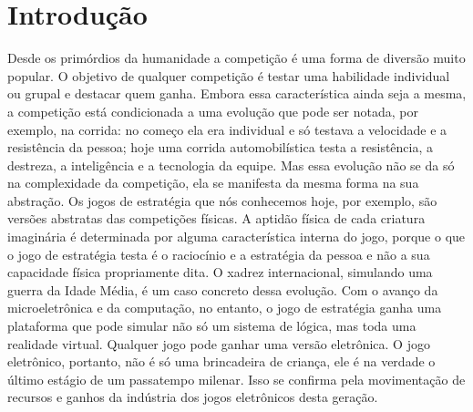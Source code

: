 \chapter{Introdução}
\label{cap:indtroducao}
%
Desde os primórdios da humanidade a competição é uma forma de diversão muito popular. O objetivo de qualquer competição é testar uma habilidade individual ou grupal e destacar quem ganha. Embora essa característica ainda seja a mesma, a competição está condicionada a uma evolução que pode ser notada, por exemplo, na corrida: no começo ela era individual e só testava a velocidade e a resistência da pessoa; hoje uma corrida automobilística testa a resistência, a destreza, a inteligência e a tecnologia da equipe.
Mas essa evolução não se da só na complexidade da competição, ela se manifesta da mesma forma na sua abstração. Os jogos de estratégia que nós conhecemos hoje, por exemplo, são versões abstratas das competições físicas. A aptidão física de cada criatura imaginária é determinada por alguma característica interna do jogo, porque o que o jogo de estratégia testa é o raciocínio e a estratégia da pessoa e não a sua capacidade física propriamente dita. O xadrez internacional, simulando uma guerra da Idade Média, é um caso concreto dessa evolução.
Com o avanço da microeletrônica e da computação, no entanto, o jogo de estratégia ganha uma plataforma que pode simular não só um sistema de lógica, mas toda uma realidade virtual. Qualquer jogo pode ganhar uma versão eletrônica. O jogo eletrônico, portanto, não é só uma brincadeira de criança, ele é na verdade o último estágio de um passatempo milenar. Isso se confirma pela movimentação de recursos e ganhos da indústria dos jogos eletrônicos desta geração.
%
%
